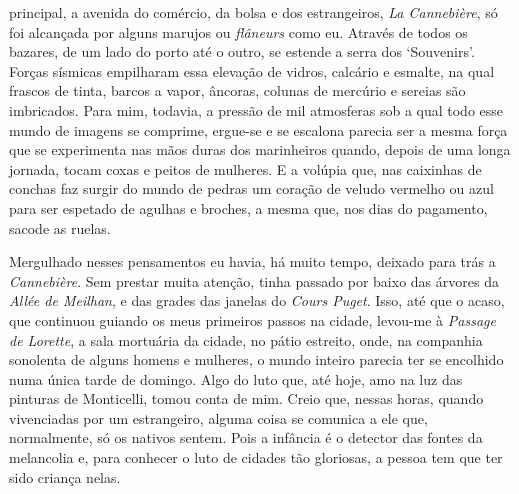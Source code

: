 principal, a avenida do comércio, da bolsa e dos estrangeiros, \emph{La
Cannebière}, só foi alcançada por alguns marujos ou \emph{flâneurs} como
eu. Através de todos os bazares, de um lado do porto até o outro, se
estende a serra dos `Souvenirs'. Forças sísmicas empilharam essa
elevação de vidros, calcário e esmalte, na qual frascos de tinta, barcos
a vapor, âncoras, colunas de mercúrio e sereias são imbricados. Para
mim, todavia, a pressão de mil atmosferas sob a qual todo esse mundo de
imagens se comprime, ergue-se e se escalona parecia ser a mesma força
que se experimenta nas mãos duras dos marinheiros quando, depois de uma
longa jornada, tocam coxas e peitos de mulheres. E a volúpia que, nas
caixinhas de conchas faz surgir do mundo de pedras um coração de veludo
vermelho ou azul para ser espetado de agulhas e broches, a mesma que,
nos dias do pagamento, sacode as ruelas.

Mergulhado nesses pensamentos eu havia, há muito tempo, deixado para
trás a \emph{Cannebière}. Sem prestar muita atenção, tinha passado por
baixo das árvores da \emph{Allée de Meilhan}, e das grades das janelas
do \emph{Cours Puget}. Isso, até que o acaso, que continuou guiando os
meus primeiros passos na cidade, levou-me à \emph{Passage de Lorette}, a
sala mortuária da cidade, no pátio estreito, onde, na companhia
sonolenta de alguns homens e mulheres, o mundo inteiro parecia ter se
encolhido numa única tarde de domingo. Algo do luto que, até hoje, amo
na luz das pinturas de Monticelli, tomou conta de mim. Creio que, nessas
horas, quando vivenciadas por um estrangeiro, alguma coisa se comunica a
ele que, normalmente, só os nativos sentem. Pois a infância é o detector
das fontes da melancolia e, para conhecer o luto de cidades tão
gloriosas, a pessoa tem que ter sido criança nelas.

